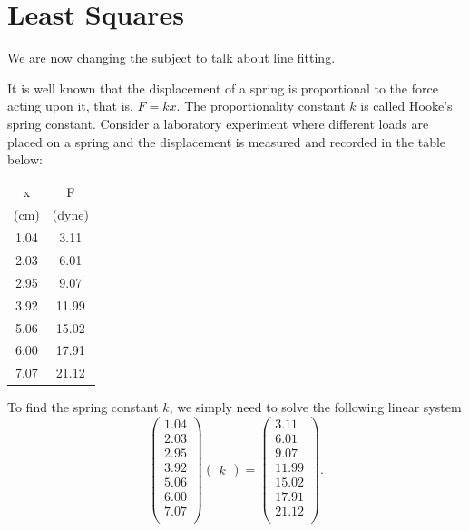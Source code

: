 \section*{Least Squares}

We are now changing the subject to talk about line fitting.

It is well known that the displacement of a spring is proportional
to the force acting upon it, that is, $F = k x$.  The proportionality
constant $k$ is called Hooke's spring constant.  Consider a laboratory
experiment where different loads are placed on a spring and the displacement
is measured and recorded in the table below:
\vspace{5mm}\\
\begin{center}
\begin{tabular}{|c|c|}
	\hline
x & F \\
(cm) & (dyne)\\
\hline
1.04  & 3.11 \\
2.03  &  6.01\\
2.95  &  9.07\\
3.92  &  11.99\\
5.06  &  15.02\\
6.00  &  17.91\\
7.07  &  21.12\\
\hline
\end{tabular}
\end{center}
\vspace{5mm}
To find the spring constant $k$, we simply need to solve the following linear system
\[
\begin{pmatrix}
1.04\\
2.03\\
2.95\\
3.92\\
5.06\\
6.00\\
7.07\\
\end{pmatrix}
\begin{pmatrix}k\end{pmatrix} =
\begin{pmatrix}
3.11 \\
6.01\\
9.07\\
11.99\\
15.02\\
17.91\\
21.12\\
\end{pmatrix}.
\]
